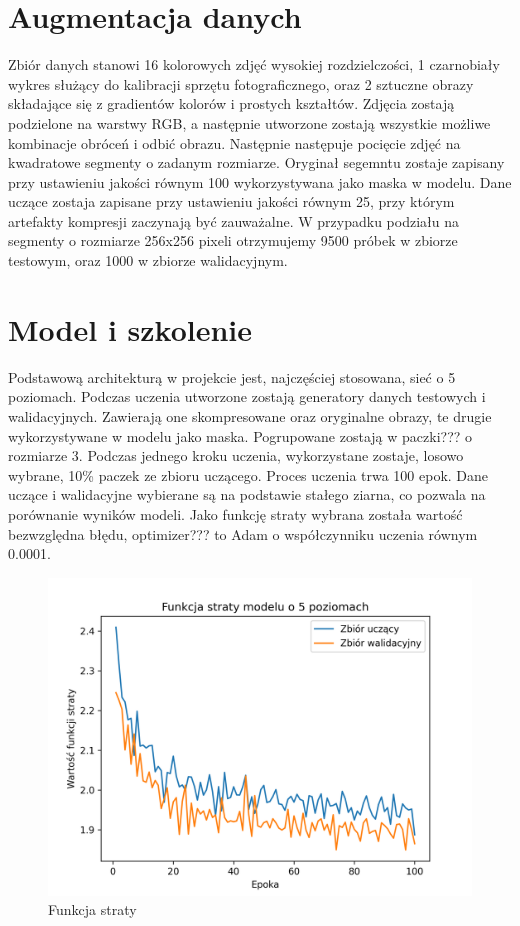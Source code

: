 \documentclass[a4paper,11pt]{article}
\begin{document}
\section{Augmentacja danych}
Zbiór danych stanowi 16 kolorowych zdjęć wysokiej rozdzielczości, 1 czarnobiały wykres służący do kalibracji sprzętu fotograficznego,
oraz 2 sztuczne obrazy składające się z gradientów kolorów i prostych kształtów.
Zdjęcia zostają podzielone na warstwy RGB, a następnie utworzone zostają wszystkie możliwe kombinacje obróceń i odbić obrazu.
Następnie następuje pocięcie zdjęć na kwadratowe segmenty o zadanym rozmiarze.
Oryginał segemntu zostaje zapisany przy ustawieniu jakości równym 100 wykorzystywana jako maska w modelu.
Dane uczące zostaja zapisane przy ustawieniu jakości równym 25, przy którym artefakty kompresji zaczynają być zauważalne.
W przypadku podziału na segmenty o rozmiarze 256x256 pixeli otrzymujemy 9500 próbek w zbiorze testowym, oraz 1000 w zbiorze walidacyjnym.

\section{Model i szkolenie}
Podstawową architekturą w projekcie jest, najczęściej stosowana, sieć o 5 poziomach.
Podczas uczenia utworzone zostają generatory danych testowych i walidacyjnych.
Zawierają one skompresowane oraz oryginalne obrazy, te drugie wykorzystywane w modelu jako maska.
Pogrupowane zostają w paczki??? o rozmiarze 3.
Podczas jednego kroku uczenia, wykorzystane zostaje, losowo wybrane, 10\% paczek ze zbioru uczącego.
Proces uczenia trwa 100 epok.
Dane uczące i walidacyjne wybierane są na podstawie stałego ziarna, co pozwala na porównanie wyników modeli.
Jako funkcję straty wybrana została wartość bezwzględna błędu, optimizer??? to Adam o współczynniku uczenia równym 0.0001.

\begin{figure}[h!]
\begin{center}
	\includegraphics[width=0.7\columnwidth]{loss5.png}
	\caption{Funkcja straty}
\end{center}
\end{figure}
\end{document}
